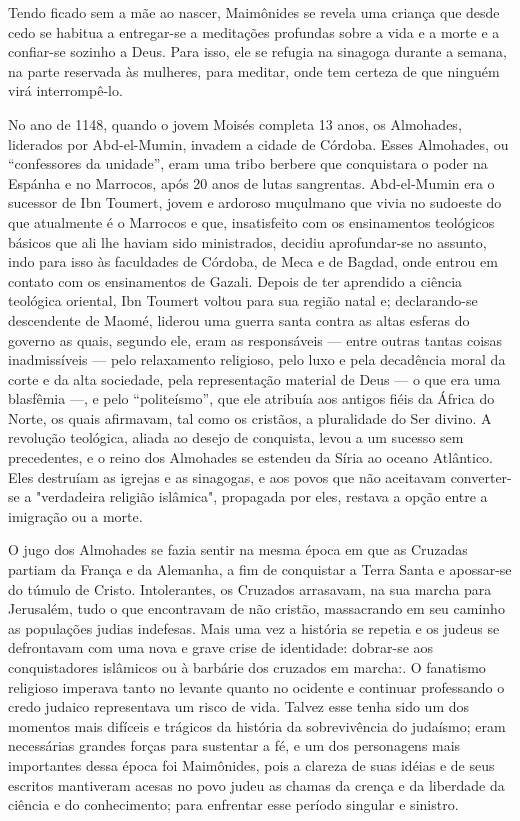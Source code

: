 Tendo ficado sem a mãe ao nascer, Maimônides se revela uma crian­ça que
desde cedo se habitua a entregar-se a meditações profundas sobre a vida
e a morte e a confiar-se sozinho a Deus. Para isso, ele se refugia na
sinagoga durante a semana, na parte reservada às mulheres, para meditar,
onde tem cer­teza de que ninguém virá interrompê-lo.

No ano de 1148, quando o jovem Moisés completa 13 anos, os Al­mohades,
liderados por Abd-el-Mumin, invadem a cidade de Córdoba. Esses
Almohades, ou ``confessores da unidade'', eram uma tribo berbere que
con­quistara o poder na Espánha e no Marrocos, após 20 anos de lutas
sangrentas. Abd-el-Mumin era o sucessor de Ibn Toumert, jovem e ardoroso
muçulmano que vivia no sudoeste do que atualmente é o Marrocos e que,
insatisfeito com os ensinamentos teológicos básicos que ali lhe haviam
sido ministrados, deci­diu aprofundar-se no assunto, indo para isso às
faculdades de Córdoba, de Me­ca e de Bagdad, onde entrou em contato com
os ensinamentos de Gazali. De­pois de ter aprendido a ciência teológica
oriental, Ibn Toumert voltou para sua região natal e; declarando-se
descendente de Maomé, liderou uma guerra santa contra as altas esferas
do governo as quais, segundo ele, eram as responsáveis --- entre outras
tantas coisas inadmissíveis --- pelo relaxamento religioso, pelo luxo e
pela decadência moral da corte e da alta sociedade, pela representação
material de Deus --- o que era uma blasfêmia ---, e pelo ``politeísmo'',
que ele atribuía aos antigos fiéis da África do Norte, os quais
afirmavam, tal como os cristãos, a pluralidade do Ser divino. A
revolução teológica, aliada ao desejo de conquista, levou a um sucesso
sem precedentes, e o reino dos Almohades se estendeu da Síria ao oceano
Atlântico. Eles destruíam as igrejas e as sinago­gas, e aos povos que
não aceitavam converter-se a "verdadeira religião islâmi­ca", propagada
por eles, restava a opção entre a imigração ou a morte.

O jugo dos Almohades se fazia sentir na mesma época em que as Cru­zadas
partiam da França e da Alemanha, a fim de conquistar a Terra Santa e
apossar-se do túmulo de Cristo. Intolerantes, os Cruzados arrasavam, na
sua mar­cha para Jerusalém, tudo o que encontravam de não cristão,
massacrando em seu caminho as populações judias indefesas. Mais uma vez
a história se repetia e os judeus se defrontavam com uma nova e grave
crise de identidade: dobrar-se aos conquistadores islâmicos ou à
barbárie dos cruzados em marcha:. O fana­tismo
religioso imperava tanto no levante quanto no ocidente e continuar
pro­fessando o credo judaico representava um risco de vida. Talvez esse
tenha sido um dos momentos mais difíceis e trágicos da história da
sobrevivência do ju­daísmo; eram necessárias grandes forças para
sustentar a fé, e um dos persona­gens mais importantes dessa época foi
Maimônides, pois a clareza de suas idéias e de seus escritos mantiveram
acesas no povo judeu as chamas da crença e da liberdade da ciência e do
conhecimento; para enfrentar esse período singular e sinistro.

